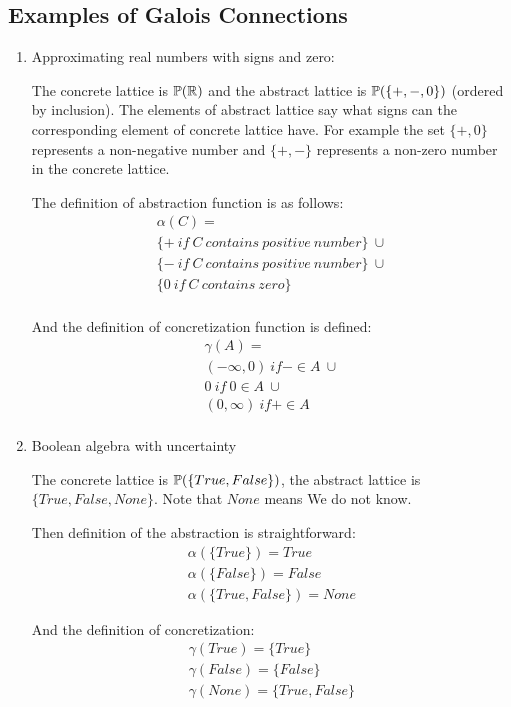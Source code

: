 \subsection*{Examples of Galois Connections}
\begin{enumerate}
    \item Approximating real numbers with signs and zero:

    The concrete lattice is $\mathbb{P}(\mathbb{R})$ and the abstract lattice is $\mathbb{P}(\{+, -, 0\})$ (ordered by %
    inclusion).
    The elements of abstract lattice say what signs can the corresponding element of concrete lattice have.
    For example the set $\{+, 0\}$ represents a non-negative number and $\{+, -\}$ represents a non-zero number in the
    concrete lattice.

    The definition of abstraction function is as follows:
    \begin{gather*}
        \alpha(C) =\\
        \{+ \: if \: C \: contains \: positive \: number\} \: \cup\\
        \{- \: if \: C \: contains \: positive \: number\} \: \cup\\
        \{0 \: if \: C \: contains \: zero\}\\
    \end{gather*}

    And the definition of concretization function is defined:
    \begin{gather*}
        \gamma(A) =\\
        (-\infty, 0) \: if - \in A \: \cup\\
        {0} \: if \: 0 \in A \: \cup\\
        (0, \infty) \: if + \in A \: \\
    \end{gather*}

    \item Boolean algebra with uncertainty

    The concrete lattice is $\mathbb{P}(\{True, False\})$, the abstract lattice is $\{True, False, None\}$.
    Note that $None$ means We do not know. %

    Then definition of the abstraction is straightforward:
    \begin{gather*}
        \alpha(\{True\}) = True\\
        \alpha(\{False\}) = False\\
        \alpha(\{True, False\}) = None
    \end{gather*}

    And the definition of concretization:
    \begin{gather*}
        \gamma(True) = \{True\}\\
        \gamma(False) = \{False\}\\
        \gamma(None) = \{True, False\}
    \end{gather*}
\end{enumerate}

